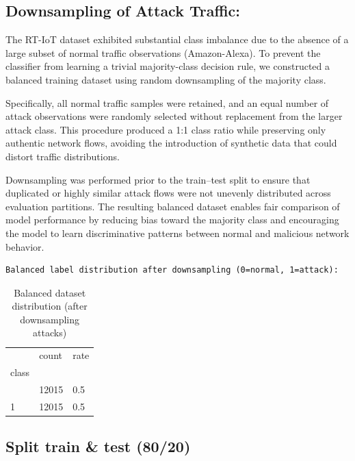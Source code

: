 \documentclass[
  letterpaper,
  DIV=11,
  numbers=noendperiod]{scrartcl}
\begin{document}
\subsection{Downsampling of Attack
Traffic:}\label{downsampling-of-attack-traffic}

The RT-IoT dataset exhibited substantial class imbalance due to the
absence of a large subset of normal traffic observations (Amazon-Alexa).
To prevent the classifier from learning a trivial majority-class
decision rule, we constructed a balanced training dataset using random
downsampling of the majority class.

Specifically, all normal traffic samples were retained, and an equal
number of attack observations were randomly selected without replacement
from the larger attack class. This procedure produced a 1:1 class ratio
while preserving only authentic network flows, avoiding the introduction
of synthetic data that could distort traffic distributions.

Downsampling was performed prior to the train--test split to ensure that
duplicated or highly similar attack flows were not unevenly distributed
across evaluation partitions. The resulting balanced dataset enables
fair comparison of model performance by reducing bias toward the
majority class and encouraging the model to learn discriminative
patterns between normal and malicious network behavior.

\begin{verbatim}
Balanced label distribution after downsampling (0=normal, 1=attack):
\end{verbatim}

\begin{longtable}[]{@{}lll@{}}

\caption{\label{tbl-rtiot-lr-balanced}Balanced dataset distribution
(after downsampling attacks)}

\tabularnewline

\toprule\noalign{}
& count & rate \\
class & & \\
\midrule\noalign{}
\endhead
\bottomrule\noalign{}
\endlastfoot
0 & 12015 & 0.5 \\
1 & 12015 & 0.5 \\

\end{longtable}

\subsection{Split train \& test (80/20)}\label{split-train-test-8020}
\end{document}
